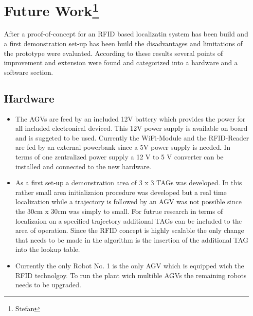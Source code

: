 
\section[Future Work]{Future Work\footnote{Stefan}}
After a proof-of-concept for an RFID based localizatin system has been build and a first demonstration set-up has been build the disadvantages and limitations of the prototype were evaluated. According to these results several points of improvement and extension were found and categorized into a hardware and a software section. 
\subsection{Hardware}
\begin{itemize}
\item The AGVs are feed by an included 12V battery which provides the power for all included electronical deviced. This 12V power supply is available on board and is suggeted to be used. Currently the WiFi-Module and the RFID-Reader are fed by an external powerbank since a 5V power supply is needed. In terms of one zentralized power supply a 12 V to 5 V converter can be installed and connected to the new hardware.
\item As a first set-up a demonstration area of 3 x 3 TAGs was developed. In this rather small area initializaion procedure was developed but a real time localization while a trajectory is followed by an AGV was not possible since the 30cm x 30cm was simply to small. For futrue research in terms of localizaion on a specified trajectory additional TAGs can be included to the area of operation. Since the RFID concept is highly scalable the only change that needs to be made in the algorithm is the insertion of the additional TAG into the lookup table.
\item Currently the only Robot No. 1 is the only AGV which is equipped wich the RFID technolgoy. To run the plant wich multible AGVs the remaining robots needs to be upgraded.\\
\end{itemize}
